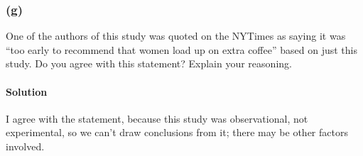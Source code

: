\documentclass[]{article}
\let\oldparagraph\paragraph
\renewcommand{\paragraph}[1]{\oldparagraph{#1}\mbox{}}
\begin{document}
\subsubsection{(g)}\label{g}

One of the authors of this study was quoted on the NYTimes as saying it
was ``too early to recommend that women load up on extra coffee'' based
on just this study. Do you agree with this statement? Explain your
reasoning.

\paragraph{Solution}\label{solution-20}

I agree with the statement, because this study was observational, not
experimental, so we can't draw conclusions from it; there may be other
factors involved.
\end{document}
